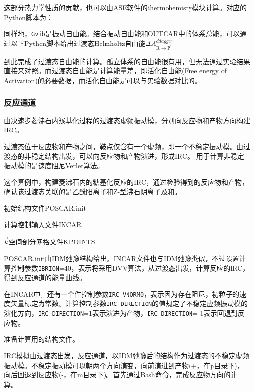 这部分热力学性质的贡献，也可以由\textrm{ASE}软件的\textrm{thermohemisty}模块计算。对应的\textrm{Python}脚本为：

同样地，\texttt{Gvib}是振动自由能。结合振动自由能和\textrm{OUTCAR}中的体系总能，可以通过以下\textrm{Python}脚本给出过渡态\textrm{Helmholtz}自由能$\Delta A_{\mathrm{R}\rightarrow\mathrm{P}^{\prime}}^{ddagger}$

到此完成了过渡态自由能的计算。孤立体系的自由能很有用，但无法通过实验结果直接来对照。而过渡态自由能是计算能量差，即活化自由能\textrm{(Free energy of Activation)}的必要数据，而活化自由能是可以与实验数据对比的。

\subsubsection{反应通道}
由决速步菱沸石内羰基化过程的过渡态虚频振动模，分别向反应物和产物方向构建\textrm{IRC}。

过渡态位于反应物和产物之间，鞍点仅含有一个虚频，即一个不稳定振动模。由过渡态的非稳定结构出发，可以向反应物和产物演进，形成\textrm{IRC}。%
用于计算非稳定振动模的是速度阻尼\textrm{Verlet}算法。

这个算例中，构建菱沸石内的糖基化反应的\textrm{IRC}，通过检验得到的反应物和产物，确认该过渡态关联的是乙酰阳离子和\textrm{Z}-型沸石阴离子及和。

初始结构文件\textrm{POSCAR.init}

计算控制输入文件\textrm{INCAR}

$\vec k$空间剖分网格文件\textrm{KPOINTS}

\textrm{POSCAR.init}由\textrm{IDM}弛豫结构给出。\textrm{INCAR}文件也与\textrm{IDM}弛豫类似，不过设置计算控制参数\texttt{IBRION}=40，表示将采用\textrm{DVV}算法，从过渡态出发，计算反应的\textrm{IRC}，得到反应通道的能量曲线。

在\textrm{INCAR}中，还有一个件控制参数\texttt{IRC\_VNORM0}，表示因为存在阻尼，初粒子的速度矢量标定为常数。计算控制参数\texttt{IRC\_DIRECTION}的值规定了不稳定虚频振动模的演化方向，\texttt{IRC\_DIRECTION}=1表示演进为产物，\texttt{IRC\_DIRECTION}=-1表示回退到反应物。

准备计算用的结构文件。

\textrm{IRC}模拟由过渡态出发，反应通道，以\textrm{IDM}弛豫后的结构作为过渡态的不稳定虚频振动模。不稳定振动模可以朝两个方向演变，向前演进到产物(+，在\textrm{p}目录下)，向后回退到反应物(-，在\textrm{m}目录下)。首先通过\textrm{Bash}命令，完成反应物方向的计算。

